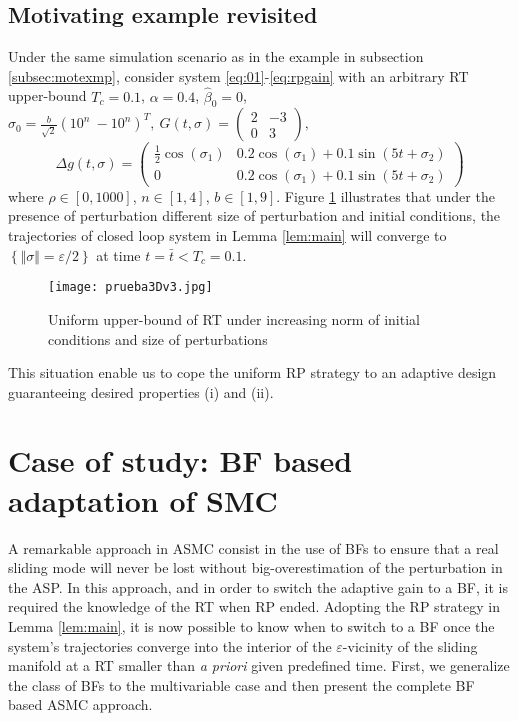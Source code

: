 \documentclass[twocolumn]{autart}    %
\begin{document}
\subsection{Motivating example revisited}\label{ssec:MexampREV}
\vspace{-3mm}
Under the same simulation scenario as in the example in subsection \ref{subsec:motexmp},  consider system \eqref{eq:01}-\eqref{eq:rpgain} with an arbitrary RT upper-bound $T_c=0.1$,  $\alpha=0.4$, $\hat{\beta}_0=0$, $
\sigma_0=\frac{b}{\sqrt{2}}\left(
10^{n} \:
-10^{n}
\right)^T,\:G(t,\sigma)=\begin{pmatrix}
2 & -3\\
0 & 3
\end{pmatrix},$
\begin{equation*}
\Delta g(t,\sigma)=\begin{pmatrix}
\tfrac{1}{2}\cos(\sigma_1) & 0.2\cos(\sigma_1)+0.1\sin(5t+\sigma_2)\\
0 & 0.2\cos(\sigma_1)+0.1\sin(5t+\sigma_2)
\end{pmatrix}
\end{equation*} where $\rho \in [0,1000]$, $n\in [1,4]$, $b\in [1,9]$. Figure \ref{fig:3Duniform} illustrates that under the presence of perturbation different size of perturbation and initial conditions,  the trajectories of closed loop system in Lemma \ref{lem:main} will converge to $\left\lbrace\Vert \sigma \Vert = \varepsilon/2 \right\rbrace$ at time $t=\bar{t}< T_c=0.1$. 
\begin{figure}[h!]
		\centering
		\texttt{[image: prueba3Dv3.jpg]}%
		\caption{Uniform upper-bound of RT under increasing norm of initial conditions and size of perturbations}
		\label{fig:3Duniform}
	\end{figure}
This situation enable us to cope the uniform RP strategy to an adaptive design guaranteeing desired properties (i) and (ii).
\section{Case of study: BF based adaptation of SMC }
\vspace{-3mm}
A remarkable approach in ASMC consist in the use of BFs to ensure that a real sliding mode will never be lost without big-overestimation of the perturbation in the ASP.  In this approach, and in order to switch the adaptive gain to a BF, it is required the knowledge of the RT when RP ended. Adopting the RP strategy in Lemma \ref{lem:main},  it is now possible to know when to switch to a BF once the system's trajectories converge into the interior of the $\varepsilon$-vicinity of the sliding manifold at a RT smaller than \textit{a priori} given predefined time. First, we generalize the class of BFs to the multivariable case and then present the complete BF based ASMC approach.
\end{document}

